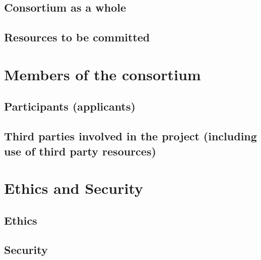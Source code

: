 \documentclass[12pt]{book}
\begin{document}

 
\section{Consortium as a whole}

\section{Resources to be committed}

\chapter{Members of the consortium}

\section{Participants (applicants)}



\section{Third parties involved in the project (including use of third party resources)}


\chapter{Ethics and Security}

\section{Ethics}

\section{Security}





\end{document}
